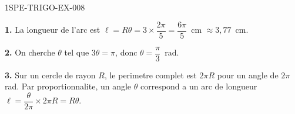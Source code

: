 \begin{corrige}{1SPE-TRIGO-EX-008}

\textbf{1.} La longueur de l'arc est $\ell = R\theta = 3 \times \dfrac{2\pi}{5} = \dfrac{6\pi}{5}$~cm $\approx 3{,}77$~cm.

\textbf{2.} On cherche $\theta$ tel que $3\theta = \pi$, donc $\theta = \dfrac{\pi}{3}$~rad.

\textbf{3.} Sur un cercle de rayon $R$, le perimetre complet est $2\pi R$ pour un angle de $2\pi$ rad. Par proportionnalite, un angle $\theta$ correspond a un arc de longueur $\ell = \dfrac{\theta}{2\pi} \times 2\pi R = R\theta$.

\end{corrige}
